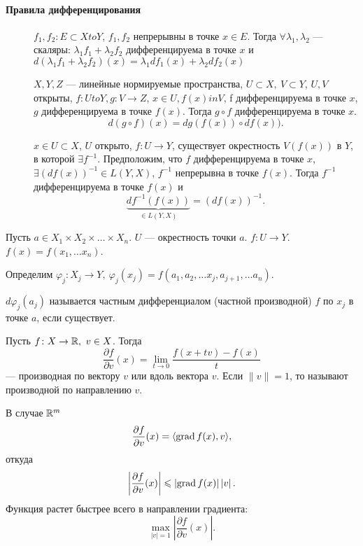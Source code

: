 \documentclass[10pt,dvipsnames]{report}
\begin{document}
\paragraph{Правила дифференцирования}
\begin{description}
	\item[] $ f_1, f_2: E \subset X to Y$, $ f_1, f_2$ непрерывны в точке $ x \in E$. Тогда $ \forall \lambda_1, \lambda_2$ --- скаляры:
	$\lambda_1f_1 + \lambda_2 f_2 $ дифференцируема в точке $ x$ и $ d(\lambda_1 f_1 + \lambda_2 f_2) (x) = \lambda_1df_1(x) + \lambda_2df_2(x)$
	\item[] $ X, Y, Z$ --- линейные нормируемые пространства, $ U \subset X, ~ V \subset Y$, $ U, V$ открыты, $ f: U to Y, g : V \to  Z$, $ x \in U, f(x) in V$, f дифференцируема в точке $ x$, $ g$  дифференцируема в точке $ f(x)$. Тогда $ g \circ f$ дифференцируема в точке $ x$.
	 \[
	     d(g \circ f)(x) = dg(f(x)) \circ df(x))
	.\] 
\item[] $ x \in U \subset X$, $ U$ открыто, $ f: U \to Y$, существует окрестность $ V(f(x))$ в $ Y$, в которой  $ \exists f^{-1}$. Предположим, что $ f$ дифференцируема в точке $ x$, $ \exists \left( df(x) \right)^{-1} \in L(Y, X)$, $ f^{-1}$ непрерывна в точке $ f(x)$. Тогда  $ f^{-1}$ дифференцируема в точке $ f(x)$ и \[
		\underbrace{df^{-1}(f(x))}_{ \in L(Y, X)} = \left( df(x) \right)^{-1}
	.\] 
\end{description}


\begin{defn}
    Пусть $ a \in  X_1 \times X_2 \times  \ldots  \times X_n$. $ U$ --- окрестность точки $ a$.  $ f\colon  U \to Y$.  $ f(x) = f(x_1, \ldots x_{n})$.

    Определим $ \varphi _j \colon  X_j \to  Y, ~ \varphi _j(x_j) = f(a_1, a_2, \ldots x_j, a_{j+1}, \ldots a_n)$.

    $ d \varphi _j (a_j)$ называется {\sf частным дифференциалом (частной производной)} $ f$ по $ x_j$ в точке $ a$, если существует. 
\end{defn}


\begin{defn}
    Пусть $ f \colon X \to  \mathbb{R}, ~ v \in X$. Тогда 
    \[
	\frac{ \partial f}{ \partial v}(x) = \lim_{t \to  0} \frac{f(x+tv) - f(x)}{t}
    \] 
    --- {\sf производная по вектору} $ v$ или {\sf вдоль вектора}  $ v$. Если  $ \| v \| = 1$, то называют {\sf производной по направлению} $ v$.  
\end{defn}
\begin{prop}
    В случае $ \mathbb{R}^{m} $ 
    \[
	\frac{ \partial f}{ \partial v} (x) = \langle \operatorname{grad} f(x), v \rangle
    ,\] 
    откуда
    \[
	\left| \frac{ \partial f}{ \partial v}(x) \right| \leqslant \left| \operatorname{grad} f(x) \right| \left| v \right| 
    .\] 
    Функция растет быстрее всего в направлении градиента:
    \[
	\max_{\left| v \right| = 1} \left| \frac{ \partial f}{ \partial v} (x)\right| 
    .\] 
\end{prop}
\end{document}
